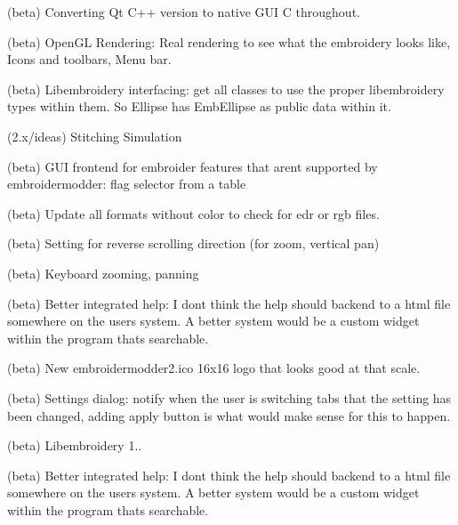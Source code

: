 \begin{DoxyRefList}
\label{todo__todo000378}%
%
(beta) Converting Qt C++ version to native GUI C throughout.

\label{todo__todo000379}%
%
(beta) Open\+GL Rendering\+: {\ttfamily Real} rendering to see what the embroidery looks like, Icons and toolbars, Menu bar.

\label{todo__todo000380}%
%
(beta) Libembroidery interfacing\+: get all classes to use the proper libembroidery types within them. So {\ttfamily Ellipse} has {\ttfamily Emb\+Ellipse} as public data within it.

\label{todo__todo000327}%
%
(2.\+x/ideas) Stitching Simulation

\label{todo__todo000382}%
%
(beta) GUI frontend for embroider features that aren\textquotesingle{}t supported by embroidermodder\+: flag selector from a table

\label{todo__todo000383}%
%
(beta) Update all formats without color to check for edr or rgb files.

\label{todo__todo000384}%
%
(beta) Setting for reverse scrolling direction (for zoom, vertical pan)

\label{todo__todo000385}%
%
(beta) Keyboard zooming, panning

\label{todo__todo000386}%
%
(beta) Better integrated help\+: I don\textquotesingle{}t think the help should backend to a html file somewhere on the user\textquotesingle{}s system. A better system would be a custom widget within the program that\textquotesingle{}s searchable.

\label{todo__todo000387}%
%
(beta) New embroidermodder2.\+ico 16x16 logo that looks good at that scale.

\label{todo__todo000388}%
%
(beta) Settings dialog\+: notify when the user is switching tabs that the setting has been changed, adding apply button is what would make sense for this to happen.

\label{todo__todo000389}%
%
(beta) Libembroidery 1..

\label{todo__todo000390}%
%
(beta) Better integrated help\+: I don\textquotesingle{}t think the help should backend to a html file somewhere on the user\textquotesingle{}s system. A better system would be a custom widget within the program that\textquotesingle{}s searchable.


\end{DoxyRefList}
